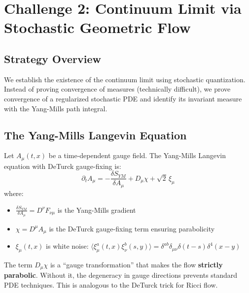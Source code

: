 \section{Challenge 2: Continuum Limit via Stochastic Geometric Flow}
\label{sec:challenge2-sgf}

\subsection{Strategy Overview}

We establish the existence of the continuum limit using stochastic quantization. 
Instead of proving convergence of measures (technically difficult), we prove 
convergence of a regularized stochastic PDE and identify its invariant measure 
with the Yang-Mills path integral.

\subsection{The Yang-Mills Langevin Equation}

\begin{definition}
\label{def:ym-langevin-app69}
Let $A_\mu(t, x)$ be a time-dependent gauge field. The Yang-Mills Langevin 
equation with DeTurck gauge-fixing is:
\begin{equation}
\label{eq:langevin}
\partial_t A_\mu = -\frac{\delta S_{YM}}{\delta A_\mu} + D_\mu \chi + \sqrt{2} \, \xi_\mu
\end{equation}
where:
\begin{itemize}
\item $\frac{\delta S_{YM}}{\delta A_\mu} = D^\nu F_{\nu\mu}$ is the Yang-Mills 
      gradient
\item $\chi = D^\mu A_\mu$ is the DeTurck gauge-fixing term ensuring parabolicity
\item $\xi_\mu(t, x)$ is white noise: $\langle \xi_\mu^a(t,x) \xi_\nu^b(s,y) \rangle 
      = \delta^{ab} \delta_{\mu\nu} \delta(t-s) \delta^4(x-y)$
\end{itemize}
\end{definition}

\begin{remark}
The term $D_\mu \chi$ is a ``gauge transformation'' that makes the flow 
\textbf{strictly parabolic}. Without it, the degeneracy in gauge directions 
prevents standard PDE techniques. This is analogous to the DeTurck trick for 
Ricci flow.
\end{remark}

